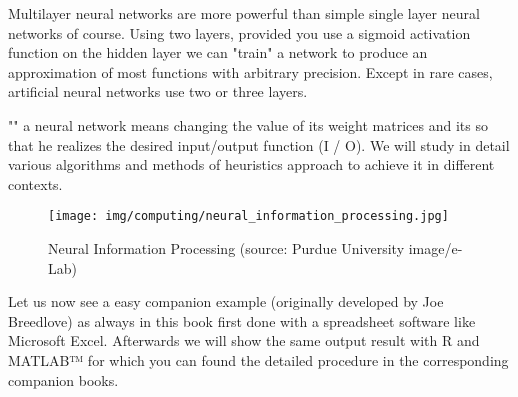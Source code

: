 	\begin{tcolorbox}[title=Remark,colframe=black,arc=10pt]
	Multilayer neural networks are more powerful than simple single layer neural networks of course. Using two layers, provided you use a sigmoid activation function on the hidden layer we can "train" a network to produce an approximation of most functions with arbitrary precision. Except in rare cases, artificial neural networks use two or three layers.
	\end{tcolorbox}
	"" a neural network means changing the value of its weight matrices and its so that he realizes the desired input/output function (I / O). We will study in detail various algorithms and methods of heuristics approach to achieve it in different contexts.
	
	\begin{figure}[H]
		\centering
		\texttt{[image: img/computing/neural\_information\_processing.jpg]}
		\caption[Neural Information Processing]{Neural Information Processing (source: Purdue University image/e-Lab)}
	\end{figure}
	Let us now see a easy companion example (originally developed by Joe Breedlove) as always in this book first done with a spreadsheet software like Microsoft Excel. Afterwards we will show the same output result with R and MATLAB™ for which you can found the detailed procedure in the corresponding companion books.
	
